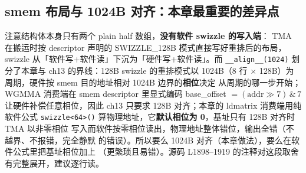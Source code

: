 \subsection{smem 布局与 1024B 对齐：本章最重要的差异点}





注意结构体本身只有两个 plain half 数组，\textbf{没有软件 swizzle 的写入端}：
TMA 在搬运时按 descriptor 声明的 SWIZZLE\_128B 模式直接写好重排后的布局，swizzle
从「软件写+软件读」下沉为「硬件写+软件读」。而 \texttt{\_\allowbreak{}\_\allowbreak{}align\_\allowbreak{}\_\allowbreak{}(1024)}
划分了本章与 ch13 的界线：128B swizzle 的重排模式以 1024B（8 行
$\times$ 128B）为周期，硬件按 smem 目的地址相对 1024B 边界的\textbf{相位}决定
从周期的哪一步开始；WGMMA 消费端在 smem descriptor 里显式编码
base\_offset $= (\mathrm{addr} \gg 7) \,\&\, 7$ 让硬件补偿任意相位，因此 ch13
只要求 128B 对齐；本章的 ldmatrix 消费端用纯软件公式 \texttt{swizzle\allowbreak{}<64>\allowbreak{}()}
算物理地址，它\textbf{默认相位为 0}，基址只有 128B 对齐时 TMA 以非零相位
写入而软件按零相位读出，物理地址整体错位，输出全错（不越界、不报错，完全静默
的错误）。所以要么 1024B 对齐（本章做法），要么在软件公式里把基址相位加上
（更繁琐且易错）。源码 L1898--1919 的注释对这段取舍有完整展开，建议逐行读。

